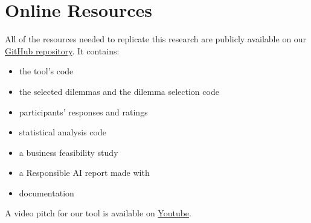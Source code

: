 \section{Online Resources}
\label{sec:resources}

All of the resources needed to replicate this research are publicly available on our
\href{https://github.com/emanuelemessina/broken-morals}{GitHub repository}.
It contains:
\begin{itemize}
  \item the tool's code
  \item the selected dilemmas and the dilemma selection code
  \item participants' responses and ratings
  \item statistical analysis code
  \item a business feasibility study
  \item a Responsible AI report made with \cite{constantinides2024raiguidelinesmethodgenerating}
  \item documentation
\end{itemize}

A video pitch for our tool is available on \href{TODO}{Youtube}.
